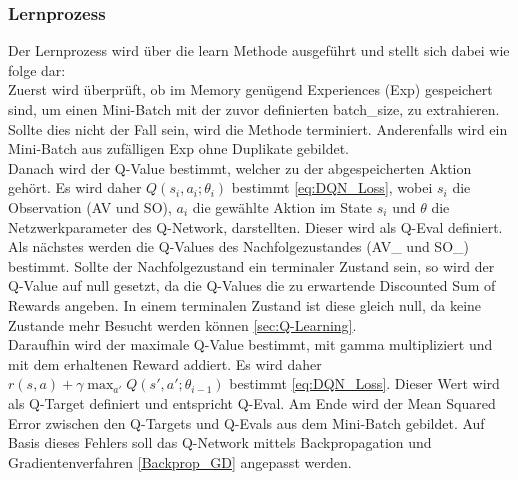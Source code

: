 \subsubsection{Lernprozess} \label{sec:Konzept_Lernprozess_DQN}
Der Lernprozess wird über die learn Methode ausgeführt und stellt sich dabei wie folge dar:\\
Zuerst wird überprüft, ob im Memory genügend Experiences (Exp) gespeichert sind, um einen Mini-Batch mit der zuvor definierten batch\_size, zu extrahieren. Sollte dies nicht der Fall sein, wird die Methode terminiert. Anderenfalls wird ein Mini-Batch aus zufälligen Exp ohne Duplikate gebildet.\\
Danach wird der Q-Value bestimmt, welcher zu der abgespeicherten Aktion gehört. Es wird daher $Q(s_i,a_i;\theta_i)$ bestimmt \ref{eq:DQN_Loss}, wobei $s_i$ die Observation (AV und SO), $a_i$ die gewählte Aktion im State $s_i$ und $\theta$ die Netzwerkparameter des Q-Network, darstellten. Dieser wird als Q-Eval definiert.
Als nächstes werden die Q-Values des Nachfolgezustandes (AV\_ und SO\_) bestimmt. Sollte der Nachfolgezustand ein terminaler Zustand sein, so wird der Q-Value auf null gesetzt, da die Q-Values die zu erwartende Discounted Sum of Rewards angeben. In einem terminalen Zustand ist diese gleich null, da keine Zustande mehr Besucht werden können \ref{sec:Q-Learning}.\\
Daraufhin wird der maximale Q-Value bestimmt, mit gamma multipliziert und mit dem erhaltenen Reward addiert. Es wird daher $r(s,a) + \gamma \max_{a'}Q(s',a';\theta_{i-1})$ bestimmt \ref{eq:DQN_Loss}. Dieser Wert wird als Q-Target definiert und entspricht Q-Eval.
Am Ende wird der Mean Squared Error zwischen den Q-Targets und Q-Evals aus dem Mini-Batch gebildet. Auf Basis dieses Fehlers soll das Q-Network mittels Backpropagation und Gradientenverfahren \ref{Backprop_GD} angepasst werden.

